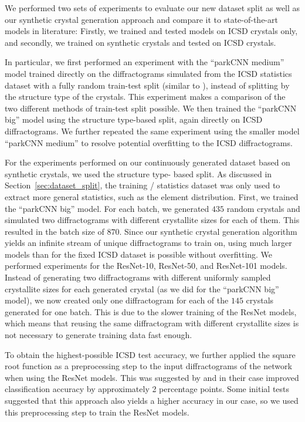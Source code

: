     We performed two sets of experiments to evaluate our new dataset split as well as our synthetic crystal generation approach and compare it to state-of-the-art models in literature: Firstly, we trained and tested models on ICSD crystals only, and secondly, we trained on synthetic crystals and tested on ICSD crystals.

    In particular, we first performed an experiment with the ``parkCNN medium''
    model trained directly on the diffractograms simulated from the ICSD
    statistics dataset with a fully random train-test split (similar to
    \supercite{parkClassificationCrystalStructure2017}), instead of splitting by
    the structure type of the crystals. This experiment makes a comparison of
    the two different methods of train-test split possible. We then trained the
    ``parkCNN big'' model using the structure type-based split, again directly
    on ICSD diffractograms. We further repeated the same experiment using the
    smaller model ``parkCNN medium'' to resolve potential overfitting to the
    ICSD diffractograms.

    For the experiments performed on our continuously generated
    dataset based on synthetic crystals, we used the structure type-
    based split. As discussed in Section~\ref{sec:dataset_split}, the training / 
    statistics dataset was only used to extract more general statistics, such as the 
    element distribution.
    First, we trained the ``parkCNN big'' model. For each
    batch, we generated $ 435 $ random crystals and simulated two diffractograms
    with different crystallite sizes for each of them. This resulted in the
    batch size of $ 870 $. 
    Since our synthetic crystal generation algorithm yields an infinite stream
    of unique diffractograms to train on, using much larger models than for the
    fixed ICSD dataset is possible without overfitting. We performed experiments
    for the ResNet-10, ResNet-50, and ResNet-101 models. Instead of generating
    two diffractograms with different uniformly sampled crystallite sizes for each generated crystal (as
    we did for the ``parkCNN big'' model), we now created only one diffractogram
    for each of the $ 145 $ crystals generated for one batch. This is due to 
    the slower training of the ResNet models, which means that reusing the same 
    diffractogram with different crystallite sizes is not necessary to generate
    training data fast enough.
    
    To obtain the
    highest-possible ICSD test accuracy, we further applied the square root
    function as a preprocessing step to the input diffractograms of the
    network when using the ResNet models. This was suggested by
    \citeauthor{zalogaCrystalSymmetryClassification2020}
    \supercite{zalogaCrystalSymmetryClassification2020} and in their case
    improved classification accuracy by approximately 2 percentage points. Some
    initial tests suggested that this approach also yields a higher accuracy in our
    case, so we used this preprocessing step to train the ResNet
    models.

